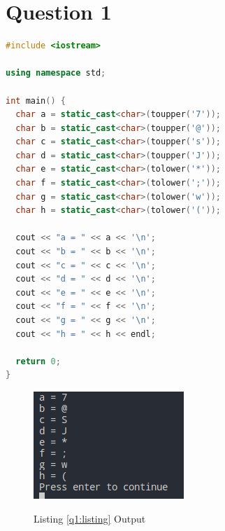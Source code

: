 \documentclass[a4paper, 10pt]{article}
\begin{document}
  \newpage
  \appendix
  \section{Question 1}
    \begin{lstlisting}[language=c++,label={q1:listing},caption={Question 1 Implementation}]
#include <iostream>

using namespace std;

int main() {
  char a = static_cast<char>(toupper('7'));
  char b = static_cast<char>(toupper('@'));
  char c = static_cast<char>(toupper('s'));
  char d = static_cast<char>(toupper('J'));
  char e = static_cast<char>(tolower('*'));
  char f = static_cast<char>(tolower(';'));
  char g = static_cast<char>(tolower('w'));
  char h = static_cast<char>(tolower('('));

  cout << "a = " << a << '\n';
  cout << "b = " << b << '\n';
  cout << "c = " << c << '\n';
  cout << "d = " << d << '\n';
  cout << "e = " << e << '\n';
  cout << "f = " << f << '\n';
  cout << "g = " << g << '\n';
  cout << "h = " << h << endl;

  return 0;
}
    \end{lstlisting}
    \begin{figure}[H]
      \centering
      \caption{Listing \ref{q1:listing} Output}
      \includegraphics{q1output.png}
      \label{q1:output}
    \end{figure}
\end{document}
